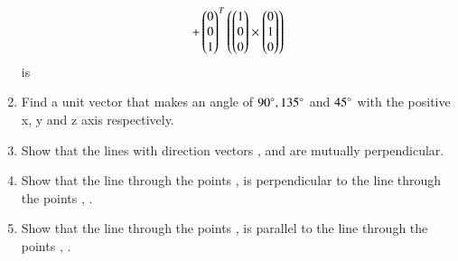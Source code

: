 \begin{enumerate}[label=\arabic*.,ref=\thesubsection.\theenumi]
\begin{multline}
\\
+\begin{pmatrix}0\\0\\1\end{pmatrix}^T\left(\begin{pmatrix}1\\0\\0\end{pmatrix}\times \begin{pmatrix}0\\1\\0\end{pmatrix}\right)
\end{multline}
%
is 
\begin{enumerate}[itemsep = 2pt]
\end{enumerate}
\solution 

\item Find a unit vector that makes an angle of $90\degree, 135\degree$ and $45\degree$ with the positive x, y and z axis respectively.
\solution 

\item Show that the lines with direction vectors ,  and  are mutually perpendicular.
\item Show that the line through the points ,  is perpendicular to the line through the points   , .
\\
\solution 

\item Show that the line through the points ,  is parallel to the line through the points   , .

\end{enumerate}
